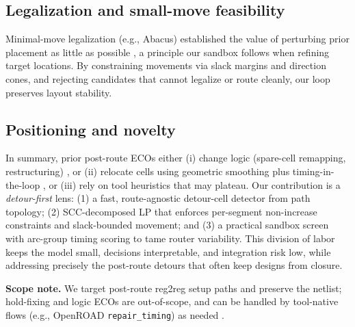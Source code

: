 \subsection{Legalization and small-move feasibility}
Minimal-move legalization (e.g., Abacus) established the value of perturbing prior placement as little as possible \cite{Spindler-ISPD08}, a principle our sandbox follows when refining target locations. By constraining movements via slack margins and direction cones, and rejecting candidates that cannot legalize or route cleanly, our loop preserves layout stability.

\subsection{Positioning and novelty}
In summary, prior post-route ECOs either (i) change logic (spare-cell remapping, restructuring) \cite{Chen-TCAD10,Ho-ASP-DAC10,Chang-DAC12,Chang-TCAD13,Wei-ASP-DAC12}, or (ii) relocate cells using geometric smoothing plus timing-in-the-loop \cite{Jung-ICCAD16,Jung-TCAD18}, or (iii) rely on tool heuristics that may plateau. Our contribution is a \emph{detour-first} lens: (1) a fast, route-agnostic detour-cell detector from path topology; (2) SCC-decomposed LP that enforces per-segment non-increase constraints and slack-bounded movement; and (3) a practical sandbox screen with arc-group timing scoring to tame router variability. This division of labor keeps the model small, decisions interpretable, and integration risk low, while addressing precisely the post-route detours that often keep designs from closure.

\smallskip
\noindent\textbf{Scope note.} We target post-route reg2reg setup paths and preserve the netlist; hold-fixing and logic ECOs are out-of-scope, and can be handled by tool-native flows (e.g., OpenROAD \texttt{repair\_timing}) as needed \cite{OpenROAD-repairtiming}.

\balance


 
  
 
 


